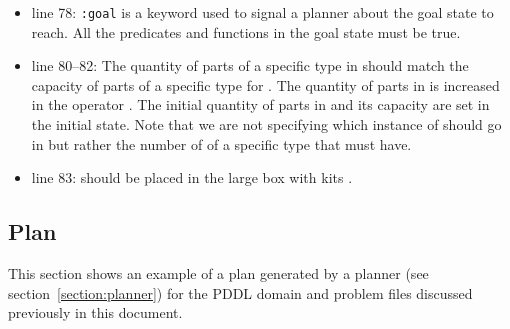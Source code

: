 \begin{itemize}
\item line 78: \texttt{:goal} is a keyword used to signal a planner about the goal state to reach. All the predicates and functions in the goal state must be true.
\item line 80--82: The quantity of parts of a specific type in  should match the capacity of parts of a specific type for . The quantity of parts in  is increased in the operator . The initial quantity of parts in  and its capacity are set in the initial state. Note that we are not specifying which instance of  should go in  but rather the number of  of a specific type that  must have.
\item line 83:  should be placed in the large box with kits .
\end{itemize}

\subsection{Plan}
This section shows an example of a plan generated by a planner (see section~\ref{section:planner}) for the PDDL domain and problem files discussed previously in this document.

